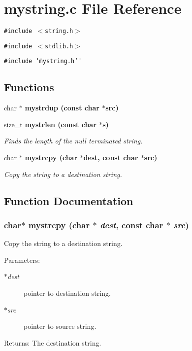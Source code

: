 \section{mystring.c File Reference}
\label{mystring_8c}
{\tt \#include $<$string.h$>$}\par
{\tt \#include $<$stdlib.h$>$}\par
{\tt \#include \char`\"{}mystring.h\char`\"{}}\par
\subsection*{Functions}
\begin{CompactItemize}
\item 
char $\ast$ \bf{mystrdup} (const char $\ast$src)
\item 
size\_\-t \bf{mystrlen} (const char $\ast$s)
\begin{CompactList}\small\item\em Finds the length of the null terminated string. \item\end{CompactList}\item 
char $\ast$ \bf{mystrcpy} (char $\ast$dest, const char $\ast$src)
\begin{CompactList}\small\item\em Copy the string to a destination string. \item\end{CompactList}\end{CompactItemize}


\subsection{Function Documentation}
\subsubsection{\setlength{\rightskip}{0pt plus 5cm}char$\ast$ mystrcpy (char $\ast$ {\em dest}, const char $\ast$ {\em src})}\label{mystring_8c_515b2c58f31e99a4564e463ffbf73e2f}


Copy the string to a destination string. 

\begin{Desc}
\item[Parameters:]
\begin{description}
\item[{\em $\ast$dest}]pointer to destination string. \item[{\em $\ast$src}]pointer to source string. \end{description}
\end{Desc}
\begin{Desc}
\item[Returns:]The destination string. \end{Desc}
